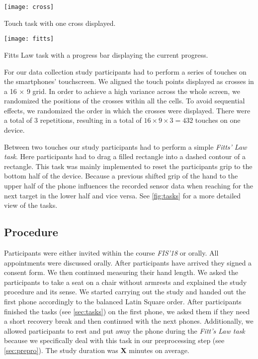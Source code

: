 
\begin{marginfigure}[-5cm]
	\texttt{[image: cross]}
	\caption{Touch task with one cross displayed.\newline}
	\label{fig:touchtask}
\end{marginfigure}

\begin{marginfigure}[!ht]
	\texttt{[image: fitts]}
	\caption{Fitts Law task with a progress bar displaying the current progress.}
	\label{fig:fittstask}
\end{marginfigure}

For our data collection study participants had to perform a series of touches on the smartphones' touchscreen. 
We aligned the touch points displayed as crosses in a 16 $ \times $ 9 grid. 
In order to achieve a high variance across the whole screen, we randomized the positions of the crosses within all the cells.
To avoid sequential effects, we randomized the order in which the crosses were displayed.
There were a total of 3 repetitions, resulting in a total  of $ 16 \times 9 \times 3 = 432 $ touches on one device.

Between two touches our study participants had to perform a simple \textit{Fitts' Law task}. 
Here participants had to drag a filled rectangle into a dashed contour of a rectangle.
This task was mainly implemented to reset the participants grip to the bottom half of the device.
Because a previous shifted grip of the hand to the upper half of the phone influences the recorded sensor data when reaching for the next target in the lower half and vice versa. 
See \cref{fig:tasks} for a more detailed view of the tasks.
\subsection{Procedure}
Participants were either invited within the course \textit{FIS'18} or orally.
All appointments were discussed orally.
After participants have arrived they signed a consent form. 
We then continued measuring their hand length.
We asked the participants to take a seat on a chair without armrests and explained the study procedure and its sense.
We started carrying out the study and handed out the first phone accordingly to the balanced Latin Square order. 
After participants finished the tasks (see \cref{sec:tasks}) on the first phone, we asked them if they need a short recovery break and then continued with the next phones.
Additionally, we allowed participants to rest and put away the phone during the \textit{Fitt's Law task} because we specifically deal with this task in our preprocessing step (see \cref{sec:prepro}).
The study duration was \textbf{X} minutes on average.
